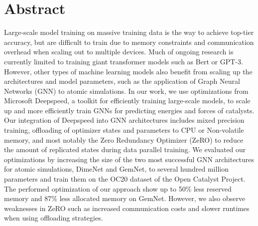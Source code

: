 \section*{Abstract}

Large-scale model training on massive training data is the way to achieve top-tier 
accuracy, but are difficult to train due to memory constraints and communication overhead 
when scaling out to multiple devices. Much of ongoing research is currently limited to 
training giant transformer models such as Bert or GPT-3. However, other types of machine 
learning models also benefit from scaling up the architectures and model parameters, 
such as the application of Graph Neural Networks (GNN) to atomic simulations. In our work, 
we use optimizations from Microsoft Deepspeed, a toolkit for efficiently training 
large-scale models, to scale up and more efficiently train GNNs for predicting energies 
and forces of catalysts. Our integration of Deepspeed into GNN architectures includes 
mixed precision training, offloading of optimizer states and parameters to CPU or Non-volatile 
memory, and most notably the Zero Redundancy Optimizer (ZeRO) to reduce the amount of 
replicated states during data parallel training. We evaluated our optimizations by increasing 
the size of the two most successful GNN architectures for atomic simulations, DimeNet 
and GemNet, to several hundred million parameters and train them on the OC20 dataset of 
the Open Catalyst Project. The performed optimization of our approach show up to 
50\% less reserved memory and 87\% less allocated memory on GemNet. However, we also observe 
weaknesses in ZeRO such as increased communication costs and slower 
runtimes when using offloading strategies. 